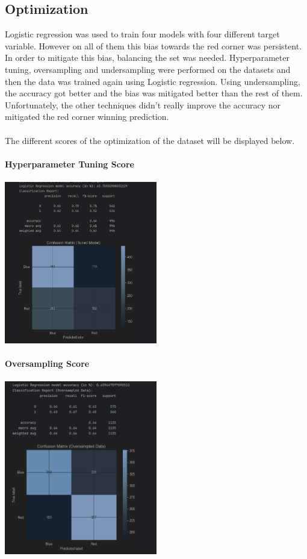 \documentclass{article}
\begin{document}
\subsection{Optimization}
Logistic regression was used to train four models with four different target variable. However on all of them this bias towards the red corner was persistent. In order to mitigate this bias, balancing the set was needed. Hyperparameter tuning, oversampling and undersampling were performed on the datasets and then the data was trained again using Logistic regression. Using undersampling, the accuracy got better and the bias was mitigated better than the rest of them. Unfortunately, the other techniques didn't really improve the accuracy nor mitigated the red corner winning prediction.\\\\
The different scores of the optimization of the dataset will be displayed below.\\\\
	{\large \textbf{Hyperparameter Tuning Score}}\\\\
	\includegraphics[width=0.5\textwidth]{images/Hyperparameter_tuning_score.png}\\\\

	{\large \textbf{Oversampling Score}}\\\\
	\includegraphics[width=0.5\textwidth]{images/Oversamping_score.png}\\\\
\end{document}
